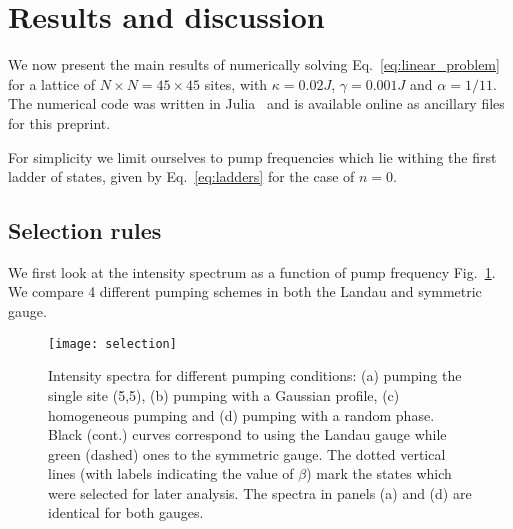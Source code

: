 \documentclass[twocolumn, 10pt, aps, superscriptaddress, floatfix, showpacs, pra, citeautoscript]{revtex4-1}
\newcommand{\co}[2]{#2}
\renewcommand{\paragraph}{\co}
\begin{document}
\section{Results and discussion}
\label{sec:results}

We now present the main results of numerically solving
Eq.~\eqref{eq:linear_problem} for a lattice of
$N \times N = 45 \times 45$ sites, with $\kappa = 0.02 J$,
$\gamma = 0.001 J$ and $\alpha = 1/11$.  The numerical code was written
in Julia~\cite{bezanson2014julia} and is available online as ancillary
files for this preprint.

For simplicity we limit ourselves to pump frequencies which lie
withing the first ladder of states, given by Eq.~\eqref{eq:ladders}
for the case of $n = 0$.


\subsection{Selection rules}
\label{sec:selection}

\paragraph{The overlap between the pump state and the eigenstate determines the intensity.}
We first look at the intensity spectrum as a function of pump
frequency Fig.~\ref{fig:pumping_schemes}.  We compare 4 different pumping
schemes in both the Landau and symmetric gauge.

\begin{figure}[htb]\centering
  \texttt{[image: selection]} %
  \caption{Intensity spectra for different pumping conditions: (a)
    pumping the single site (5,5), (b) pumping with a Gaussian
    profile, (c) homogeneous pumping and (d) pumping with a random
    phase. Black (cont.) curves correspond to using the Landau gauge while
    green (dashed) ones to the symmetric gauge. The dotted vertical
    lines (with labels indicating the value of $\beta$) mark the
    states which were selected for later analysis. The spectra in
    panels (a) and (d) are identical for both gauges.}
  \label{fig:pumping_schemes}
\end{figure}
\end{document}
